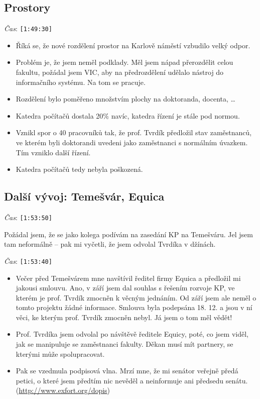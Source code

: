 \documentclass[a4paper,10pt,notitlepage]{article}
\newcommand{\ts}[1]{\texttt{[#1]}}
\newcommand{\tsp}[1]{\noindent \textit{Čas}: \ts{#1}}
\begin{document}
\subsection{Prostory}

\tsp{1:49:30}

\begin{itemize}
\item Říká se, že nové rozdělení prostor na Karlově náměstí vzbudilo velký odpor.
\item Problém je, že jsem neměl podklady. Měl jsem nápad přerozdělit celou fakultu, požádal jsem VIC, aby na předrozdělení udělalo nástroj do informačního systému. Na tom se pracuje.
\item Rozdělení bylo poměřeno množstvím plochy na doktoranda, docenta, \dots
\item Katedra počítačů dostala 20\% navíc, katedra řízení je stále pod normou.
\item Vznikl spor o 40 pracovníků tak, že prof. Tvrdík předložil stav zaměstnanců, ve kterém byli doktorandi uvedeni jako zaměstnanci s normálním úvazkem. Tím vzniklo další řízení.
\item Katedra počítačů tedy nebyla poškozená.
\end{itemize}




\subsection{Další vývoj: Temešvár, Equica}

\tsp{1:53:50}

Požádal jsem, že se jako kolega podívám na zasedání KP na Temešváru. Jel jsem tam neformálně -- pak mi vyčetli, že jsem odvolal Tvrdíka v džínách.

\tsp{1:53:40}

\begin{itemize}
\item Večer před Temešvárem mne navštívil ředitel firmy Equica a předložil mi jakousi smlouvu. Ano, v září jsem dal souhlas s řešením rozvoje KP, ve kterém je prof. Tvrdík zmocněn k věcným jednáním. Od září jsem ale neměl o tomto projektu žádné informace. Smlouva byla podepsána 18. 12. a jsou v ní věci, ke kterým prof. Tvrdík zmocněn nebyl. Já jsem o tom měl vědět! %
\item Prof. Tvrdíka jsem odvolal po návštěvě ředitele Equicy, poté, co jsem viděl, jak se manipuluje se zaměstnanci fakulty. Děkan musí mít partnery, se kterými může spolupracovat.
\item Pak se vzedmula podpisová vlna. Mrzí mne, že mi senátor veřejně předá petici, o které jsem předtím nic nevěděl a neinformuje ani předsedu senátu. (\url{http://www.exfort.org/dopis})

\end{itemize}
\end{document}
